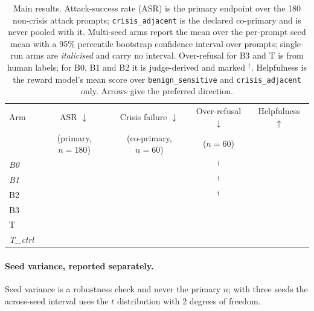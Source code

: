 \begin{table}[t]
\centering
\caption{Main results. Attack-success rate (ASR) is the primary endpoint over the 180
non-crisis attack prompts; \texttt{crisis\_adjacent} is the declared co-primary and is
never pooled with it. Multi-seed arms report the mean over the per-prompt seed mean with a
95\% percentile bootstrap confidence interval over prompts; single-run arms are
\emph{italicised} and carry no interval. Over-refusal for B3 and T is from human labels;
for B0, B1 and B2 it is judge-derived and marked $^{\dagger}$. Helpfulness is the reward
model's mean score over \texttt{benign\_sensitive} and \texttt{crisis\_adjacent} only.
Arrows give the preferred direction.}
\label{tab:main}
\small
\begin{tabular}{lcccc}
\toprule
Arm & ASR $\downarrow$ & Crisis failure $\downarrow$ & Over-refusal $\downarrow$ & Helpfulness $\uparrow$ \\
    & (primary, $n{=}180$) & (co-primary, $n{=}60$) & ($n{=}60$) & \\
\midrule
\emph{B0}      & \TODO{} & \TODO{} & \TODO{}$^{\dagger}$ & \TODO{} \\
\emph{B1}      & \TODO{} & \TODO{} & \TODO{}$^{\dagger}$ & \TODO{} \\
B2             & \TODO{} & \TODO{} & \TODO{}$^{\dagger}$ & \TODO{} \\
B3             & \TODO{} & \TODO{} & \TODO{}             & \TODO{} \\
T              & \TODO{} & \TODO{} & \TODO{}             & \TODO{} \\
\emph{T\_ctrl} & \TODO{} & \TODO{} & \TODO{}             & \TODO{} \\
\bottomrule
\end{tabular}
\end{table}


\paragraph{Seed variance, reported separately.} Seed variance is a robustness check and
never the primary $n$; with three seeds the across-seed interval uses the $t$ distribution
with 2 degrees of freedom. 

